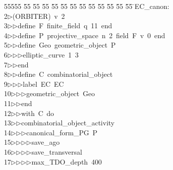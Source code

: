 %
%
\begin{tabbing}
55555 \= 55 \= 55 \= 55 \= 55 \= 55 \= 55 \= 55 \= 55 \= 55 \= 55 \= 55 \= 55 \= \>EC\_canon:\\[0pt]
2\>$\triangleright$\>(ORBITER)\ v\ 2\ \\[0pt]
3\>$\triangleright$\>$\triangleright$\>define\ F\ finite\_field\ q\ 11\ end\ \\[0pt]
4\>$\triangleright$\>$\triangleright$\>define\ P\ projective\_space\ n\ 2\ field\ F\ v\ 0\ end\ \\[0pt]
5\>$\triangleright$\>$\triangleright$\>define\ Geo\ geometric\_object\ P\ \\[0pt]
6\>$\triangleright$\>$\triangleright$\>$\triangleright$\>elliptic\_curve\ 1\ 3\ \\[0pt]
7\>$\triangleright$\>$\triangleright$\>end\ \\[0pt]
8\>$\triangleright$\>$\triangleright$\>define\ C\ combinatorial\_object\ \\[0pt]
9\>$\triangleright$\>$\triangleright$\>$\triangleright$\>label\ EC\ EC\ \\[0pt]
10\>$\triangleright$\>$\triangleright$\>$\triangleright$\>geometric\_object\ Geo\ \\[0pt]
11\>$\triangleright$\>$\triangleright$\>end\ \\[0pt]
12\>$\triangleright$\>$\triangleright$\>with\ C\ do\ \\[0pt]
13\>$\triangleright$\>$\triangleright$\>combinatorial\_object\_activity\ \\[0pt]
14\>$\triangleright$\>$\triangleright$\>$\triangleright$\>canonical\_form\_PG\ P\ \\[0pt]
15\>$\triangleright$\>$\triangleright$\>$\triangleright$\>$\triangleright$\>save\_ago\ \\[0pt]
16\>$\triangleright$\>$\triangleright$\>$\triangleright$\>$\triangleright$\>save\_transversal\ \\[0pt]
17\>$\triangleright$\>$\triangleright$\>$\triangleright$\>$\triangleright$\>max\_TDO\_depth\ 400\ \\[0pt]

\end{tabbing}
